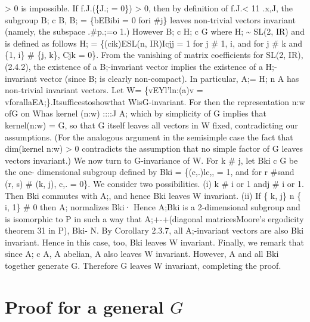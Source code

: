 \documentclass[
]{article}
\begin{document}
\textgreater{} 0 is impossible. If f.J.(\{J.; = 0\}) \textgreater{} 0,
then by definition of f.J.\textless{} 11 .x,J, the subgroup B; c B, B; =
\{bEBibi = 0 fori \#j\} leaves non-trivial vectors invariant (namely,
the subspace .\#p.;=o 1.) However B; c H; c G where H; \textasciitilde{}
SL(2, IR) and is defined as follows H; = \{(cik)ESL(n, IR)Icjj = 1 for j
\# 1, i, and for j \# k and \{1, i\} \# \{j, k\}, Cjk = 0\}. From the
vanishing of matrix coefficients for SL(2, IR), (2.4.2), the existence
of a B;-invariant vector implies the existence of a H;-invariant vector
(since B; is clearly non-compact). In particular, A;= H; n A has
non-trivial invariant vectors. Let W= \{vEYl'ln:(a)v =
vforallaEA;\}.Itsufficestoshowthat WisG-invariant. For then the
representation n:w ofG on Whas kernel (n:w) ::::J A; which by simplicity
of G implies that kernel(n:w) = G, so that G itself leaves all vectors
in W fixed, contradicting our assumptions. (For the analogous argument
in the semisimple case the fact that dim(kernel n:w) \textgreater{} 0
contradicts the assumption that no simple factor of G leaves vectors
invariant.) We now turn to G-invariance of W. For k \# j, let Bki c G be
the one- dimensional subgroup defined by Bki = \{(c,.)lc,, = 1, and for
r \#sand (r, s) \# (k, j), c,. = 0\}. We consider two possibilities. (i)
k \# i or 1 andj \# i or 1. Then Bki commutes with A;, and hence Bki
leaves W invariant. (ii) If \{ k, j\} n \{ i, 1\} \# 0 then A;
normalizes Bki· Hence A;Bki is a 2-dimensional subgroup and is
isomorphic to P in such a way that A;+-+(diagonal matricesMoore's
ergodicity theorem 31 in P), Bki- N. By Corollary 2.3.7, all
A;-invariant vectors are also Bki invariant. Hence in this case, too,
Bki leaves W invariant. Finally, we remark that since A; c A, A abelian,
A also leaves W invariant. However, A and all Bki together generate G.
Therefore G leaves W invariant, completing the proof.









\hypertarget{proof-for-a-general-G}{%
\section{Proof for a general $G$}\label{proof-for-a-general-G}}
\end{document}
